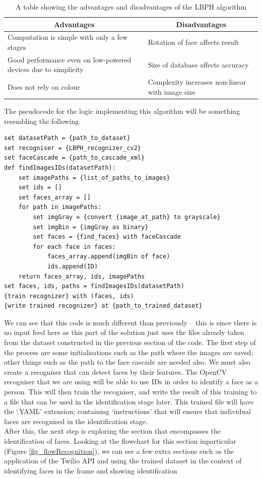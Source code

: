 \documentclass[9pt]{article}
\begin{document}
\begin{table}[H]
	\centering
	\begin{tabular}{@{}p{3in}p{3in}@{}}
		\multicolumn{1}{c}{\textbf{Advantages}}                        & \multicolumn{1}{c}{\textbf{Disadvantages}}        \\ \midrule
		Computation is simple with only a few stages                   & Rotation of face affects result                   \\
		Good performance even on low-powered devices due to simplicity & Size of database affects accuracy                 \\
		Does not rely on colour                                        & Complexity   increases non-linear with image size \\ \bottomrule
	\end{tabular}
	\caption{A table showing the advantages and disadvantages of the LBPH algorithm}
	\label{tab_lbphProCons}
\end{table}
The pseudocode for the logic implementing this algorithm will be something resembling the following.

\begin{lstlisting}
set datasetPath = {path_to_dataset} 
set recogniser = {LBPH_recognizer_cv2}
set faceCascade = {path_to_cascade_xml} 
def findImagesIDs(datasetPath): 
	set imagePaths = {list_of_paths_to_images}
	set ids = [] 
	set faces_array = [] 
	for path in imagePaths: 
		set imgGray = {convert {image_at_path} to grayscale}
		set imgBin = {imgGray as binary}
		set faces = {find_faces} with faceCascade 
		for each face in faces:
			faces_array.append(imgBin of face) 
			ids.append(ID) 
	return faces_array, ids, imagePaths 
set faces, ids, paths = findImagesIDs(datasetPath)
{train recognizer} with (faces, ids) 
{write trained recognizer} at {path_to_trained_dataset}
\end{lstlisting}

We can see that this code is much different than previously – this is since there is no input feed here as this part of the solution just uses the files already taken from the dataset constructed in the previous section of the code.
The first step of the process are some initialisations such as the path where the images are saved; other things such as the path to the face cascade are needed also. We must also create a recogniser that can detect faces by their features. The OpenCV recogniser that we are using will be able to use IDs in order to identify a face as a person. This will then train the recogniser, and write the result of this training to a file that can be used in the identification stage later. This trained file will have the `.YAML' extension; containing `instructions' that will ensure that individual faces are recognised in the identification stage.\\
After this, the next step is exploring the section that encompasses the identification of faces. Looking at the flowchart for this section inparticular (Figure \ref{fig_flowRecognition}), we can see a few extra sections such as the application of the Twilio API and using the trained dataset in the context of identifying faces in the frame and showing identification
 
\end{document}
